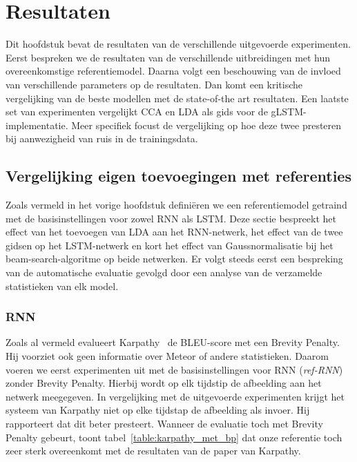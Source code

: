 \chapter{Resultaten} %
\label{cha:resultaten}
Dit hoofdstuk bevat de resultaten van de verschillende uitgevoerde experimenten. Eerst bespreken we de resultaten van de verschillende uitbreidingen met hun overeenkomstige referentiemodel. Daarna volgt een beschouwing van de invloed van verschillende parameters op de resultaten. Dan komt een kritische vergelijking van de beste modellen met de state-of-the art resultaten. Een laatste set van experimenten vergelijkt CCA en LDA als gids voor de gLSTM-implementatie. Meer specifiek focust de vergelijking op hoe deze twee presteren bij aanwezigheid van ruis in de trainingsdata.

\section{Vergelijking eigen toevoegingen met referenties}  %
\label{sec:eigen_implementaties}
Zoals vermeld in het vorige hoofdstuk defini\"eren we een referentiemodel getraind met de basisinstellingen voor zowel RNN als LSTM. Deze sectie bespreekt het effect van het toevoegen van LDA aan het RNN-netwerk, het effect van de twee gidsen op het LSTM-netwerk en kort het effect van Gaussnormalisatie bij het beam-search-algoritme op beide netwerken. Er volgt steeds eerst een bespreking van de automatische evaluatie gevolgd door een analyse van de verzamelde statistieken van elk model.

\subsection{RNN}
Zoals al vermeld evalueert Karpathy~\cite{Karpathy2015} de BLEU-score met een Brevity Penalty. Hij voorziet ook geen informatie over Meteor of andere statistieken. Daarom voeren we eerst experimenten uit met de basisinstellingen voor RNN (\emph{ref-RNN}) zonder Brevity Penalty. Hierbij wordt op elk tijdstip de afbeelding aan het netwerk meegegeven. In vergelijking met de uitgevoerde experimenten krijgt het systeem van Karpathy niet op elke tijdstap de afbeelding als invoer. Hij rapporteert dat dit beter presteert. Wanneer de evaluatie toch met Brevity Penalty gebeurt, toont tabel~\ref{table:karpathy_met_bp} dat onze referentie toch zeer sterk overeenkomt met de resultaten van de paper van Karpathy. 

